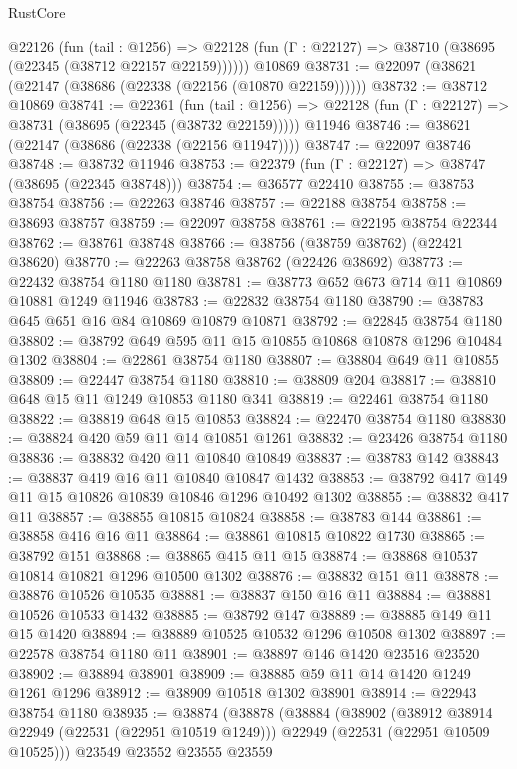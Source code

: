 \begin{lexlean}{RustCore}
\begin{coremodule}
    @22126
      (fun (tail : @1256) =>
      @22128 (fun (Γ : @22127) => @38710 (@38695 (@22345 (@38712 @22157 @22159))))))
    @10869
@38731 := @22097 (@38621 (@22147 (@38686 (@22338 (@22156 (@10870 @22159))))))
@38732 := @38712 @10869
@38741 := @22361
    (fun (tail : @1256) => @22128 (fun (Γ : @22127) => @38731 (@38695 (@22345 (@38732 @22159)))))
    @11946
@38746 := @38621 (@22147 (@38686 (@22338 (@22156 @11947))))
@38747 := @22097 @38746
@38748 := @38732 @11946
@38753 := @22379 (fun (Γ : @22127) => @38747 (@38695 (@22345 @38748)))
@38754 := @36577 @22410
@38755 := @38753 @38754
@38756 := @22263 @38746
@38757 := @22188 @38754
@38758 := @38693 @38757
@38759 := @22097 @38758
@38761 := @22195 @38754 @22344
@38762 := @38761 @38748
@38766 := @38756 (@38759 @38762) (@22421 @38620)
@38770 := @22263 @38758 @38762 (@22426 @38692)
@38773 := @22432 @38754 @1180 @1180
@38781 := @38773 @652 @673 @714 @11 @10869 @10881 @1249 @11946
@38783 := @22832 @38754 @1180
@38790 := @38783 @645 @651 @16 @84 @10869 @10879 @10871
@38792 := @22845 @38754 @1180
@38802 := @38792 @649 @595 @11 @15 @10855 @10868 @10878 @1296 @10484 @1302
@38804 := @22861 @38754 @1180
@38807 := @38804 @649 @11 @10855
@38809 := @22447 @38754 @1180
@38810 := @38809 @204
@38817 := @38810 @648 @15 @11 @1249 @10853 @1180 @341
@38819 := @22461 @38754 @1180
@38822 := @38819 @648 @15 @10853
@38824 := @22470 @38754 @1180
@38830 := @38824 @420 @59 @11 @14 @10851 @1261
@38832 := @23426 @38754 @1180
@38836 := @38832 @420 @11 @10840 @10849
@38837 := @38783 @142
@38843 := @38837 @419 @16 @11 @10840 @10847 @1432
@38853 := @38792 @417 @149 @11 @15 @10826 @10839 @10846 @1296 @10492 @1302
@38855 := @38832 @417 @11
@38857 := @38855 @10815 @10824
@38858 := @38783 @144
@38861 := @38858 @416 @16 @11
@38864 := @38861 @10815 @10822 @1730
@38865 := @38792 @151
@38868 := @38865 @415 @11 @15
@38874 := @38868 @10537 @10814 @10821 @1296 @10500 @1302
@38876 := @38832 @151 @11
@38878 := @38876 @10526 @10535
@38881 := @38837 @150 @16 @11
@38884 := @38881 @10526 @10533 @1432
@38885 := @38792 @147
@38889 := @38885 @149 @11 @15 @1420
@38894 := @38889 @10525 @10532 @1296 @10508 @1302
@38897 := @22578 @38754 @1180 @11
@38901 := @38897 @146 @1420 @23516 @23520
@38902 := @38894 @38901
@38909 := @38885 @59 @11 @14 @1420 @1249 @1261 @1296
@38912 := @38909 @10518 @1302 @38901
@38914 := @22943 @38754 @1180
@38935 := @38874
    (@38878
      (@38884
        (@38902
          (@38912 @38914 @22949 (@22531 (@22951 @10519 @1249)))
          @22949
          (@22531 (@22951 @10509 @10525)))
        @23549
        @23552
        @23555
        @23559

\end{coremodule}
\end{lexlean}
